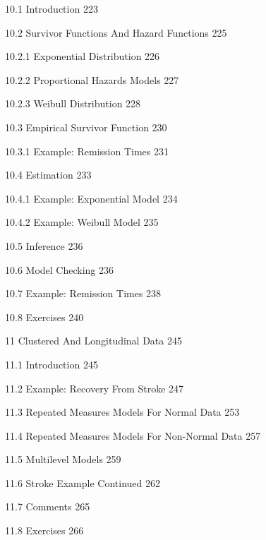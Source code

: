 10.1 Introduction 223



10.2 Survivor Functions And Hazard Functions 225



10.2.1 Exponential Distribution 226



10.2.2 Proportional Hazards Models 227



10.2.3 Weibull Distribution 228



10.3 Empirical Survivor Function 230



10.3.1 Example: Remission Times 231



10.4 Estimation 233



10.4.1 Example: Exponential Model 234



10.4.2 Example: Weibull Model 235



10.5 Inference 236



10.6 Model Checking 236



10.7 Example: Remission Times 238



10.8 Exercises 240



11 Clustered And Longitudinal Data 245



11.1 Introduction 245



11.2 Example: Recovery From Stroke 247



11.3 Repeated Measures Models For Normal Data 253



11.4 Repeated Measures Models For Non-Normal Data 257



11.5 Multilevel Models 259



11.6 Stroke Example Continued 262



11.7 Comments 265



11.8 Exercises 266



